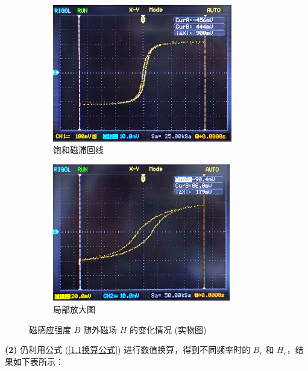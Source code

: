 \documentclass[UTF8]{article}
\theoremstyle{MyLineTheoremStyle} %
\theoremstyle{MyBlockTheoremStyle} %
\theoremstyle{MySubsubsectionStyle} %
\begin{document}
\begin{figure}[H]\centering
\begin{subfigure}[b]{0.5\columnwidth}\centering
    \includegraphics[height=170pt]{assets/1.1/(1)/CamScanner 10-22-2024 18.26_06.jpg}
    \caption{饱和磁滞回线}
\end{subfigure}\hfill
\begin{subfigure}[b]{0.5\columnwidth}\centering
    \includegraphics[height=170pt]{assets/1.1/(1)/CamScanner 10-22-2024 18.26_08.jpg}
    \caption{局部放大图}
\end{subfigure}
\caption{磁感应强度 $B$ 随外磁场 $H$ 的变化情况 (实物图)}\label{1.1照片}
\end{figure}

\noindent \textbf{(2)} 仍利用公式 (\ref{1.1换算公式}) 进行数值换算，得到不同频率时的 $B_r$ 和 $H_c$，结果如下表所示：
\end{document}
